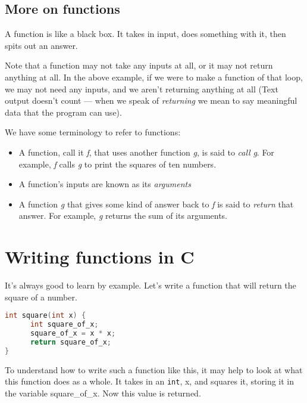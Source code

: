 \subsection{More on functions}
A function is like a black box. It takes in input, does something with it, then
spits out an answer.

Note that a function may not take any inputs at all, or it may not return
anything at all. In the above example, if we were to make a function of that
loop, we may not need any inputs, and we aren't returning anything at all (Text
output doesn't count --- when we speak of \emph{returning} we mean to say
meaningful data that the program can use).

We have some terminology to refer to functions:
\begin{itemize}
\setlength{\itemsep}{0cm}
\setlength{\parskip}{0cm}
	\item A function, call it \emph{f}, that uses another function \emph{g}, is
said to \emph{call} \emph{g}. For example, \emph{f} calls \emph{g} to print the
squares of ten numbers.
	\item A function's inputs are known as its \emph{arguments}
	\item A function \emph{g} that gives some kind of answer back to \emph{f}
is said to \emph{return} that answer. For example, \emph{g} returns the sum of
its arguments.
\end{itemize}

\section{Writing functions in C}
It's always good to learn by example. Let's write a function that will return the square of a number.

\lstset{basicstyle=\scriptsize, numbers=left, captionpos=b, tabsize=4}
\begin{lstlisting}[caption=Section \thesection listing \arabic{funccnt},language={C},
breaklines=true,xleftmargin=15pt, label=lst:section\thesection listing\arabic{funccnt}]
int square(int x) {
	  int square_of_x;
	  square_of_x = x * x;
	  return square_of_x;
}
\end{lstlisting}

To understand how to write such a function like this, it may help to look at
what this function does as a whole. It takes in an \texttt{int}, x, and squares
it, storing it in the variable square\_of\_x. Now this value is returned. 

